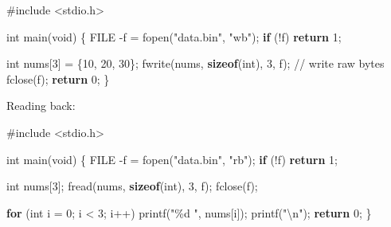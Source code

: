 \documentclass[
  letterpaper,
  DIV=11,
  numbers=noendperiod]{scrreprt}
\newenvironment{Shaded}{\begin{snugshade}}{\end{snugshade}}
\newcommand{\CommentTok}[1]{\textcolor[rgb]{0.37,0.37,0.37}{#1}}
\newcommand{\ControlFlowTok}[1]{\textcolor[rgb]{0.00,0.23,0.31}{\textbf{#1}}}
\newcommand{\DataTypeTok}[1]{\textcolor[rgb]{0.68,0.00,0.00}{#1}}
\newcommand{\DecValTok}[1]{\textcolor[rgb]{0.68,0.00,0.00}{#1}}
\newcommand{\ImportTok}[1]{\textcolor[rgb]{0.00,0.46,0.62}{#1}}
\newcommand{\KeywordTok}[1]{\textcolor[rgb]{0.00,0.23,0.31}{\textbf{#1}}}
\newcommand{\NormalTok}[1]{\textcolor[rgb]{0.00,0.23,0.31}{#1}}
\newcommand{\OperatorTok}[1]{\textcolor[rgb]{0.37,0.37,0.37}{#1}}
\newcommand{\PreprocessorTok}[1]{\textcolor[rgb]{0.68,0.00,0.00}{#1}}
\newcommand{\SpecialCharTok}[1]{\textcolor[rgb]{0.37,0.37,0.37}{#1}}
\newcommand{\StringTok}[1]{\textcolor[rgb]{0.13,0.47,0.30}{#1}}
\begin{document}
\begin{Shaded}
\begin{Highlighting}[]
\PreprocessorTok{\#include }\ImportTok{\textless{}stdio.h\textgreater{}}

\DataTypeTok{int}\NormalTok{ main}\OperatorTok{(}\DataTypeTok{void}\OperatorTok{)} \OperatorTok{\{}
    \DataTypeTok{FILE} \OperatorTok{{-}}\NormalTok{f }\OperatorTok{=}\NormalTok{ fopen}\OperatorTok{(}\StringTok{"data.bin"}\OperatorTok{,} \StringTok{"wb"}\OperatorTok{);}
    \ControlFlowTok{if} \OperatorTok{(!}\NormalTok{f}\OperatorTok{)} \ControlFlowTok{return} \DecValTok{1}\OperatorTok{;}

    \DataTypeTok{int}\NormalTok{ nums}\OperatorTok{[}\DecValTok{3}\OperatorTok{]} \OperatorTok{=} \OperatorTok{\{}\DecValTok{10}\OperatorTok{,} \DecValTok{20}\OperatorTok{,} \DecValTok{30}\OperatorTok{\};}
\NormalTok{    fwrite}\OperatorTok{(}\NormalTok{nums}\OperatorTok{,} \KeywordTok{sizeof}\OperatorTok{(}\DataTypeTok{int}\OperatorTok{),} \DecValTok{3}\OperatorTok{,}\NormalTok{ f}\OperatorTok{);} \CommentTok{// write raw bytes}
\NormalTok{    fclose}\OperatorTok{(}\NormalTok{f}\OperatorTok{);}
    \ControlFlowTok{return} \DecValTok{0}\OperatorTok{;}
\OperatorTok{\}}
\end{Highlighting}
\end{Shaded}

Reading back:

\begin{Shaded}
\begin{Highlighting}[]
\PreprocessorTok{\#include }\ImportTok{\textless{}stdio.h\textgreater{}}

\DataTypeTok{int}\NormalTok{ main}\OperatorTok{(}\DataTypeTok{void}\OperatorTok{)} \OperatorTok{\{}
    \DataTypeTok{FILE} \OperatorTok{{-}}\NormalTok{f }\OperatorTok{=}\NormalTok{ fopen}\OperatorTok{(}\StringTok{"data.bin"}\OperatorTok{,} \StringTok{"rb"}\OperatorTok{);}
    \ControlFlowTok{if} \OperatorTok{(!}\NormalTok{f}\OperatorTok{)} \ControlFlowTok{return} \DecValTok{1}\OperatorTok{;}

    \DataTypeTok{int}\NormalTok{ nums}\OperatorTok{[}\DecValTok{3}\OperatorTok{];}
\NormalTok{    fread}\OperatorTok{(}\NormalTok{nums}\OperatorTok{,} \KeywordTok{sizeof}\OperatorTok{(}\DataTypeTok{int}\OperatorTok{),} \DecValTok{3}\OperatorTok{,}\NormalTok{ f}\OperatorTok{);}
\NormalTok{    fclose}\OperatorTok{(}\NormalTok{f}\OperatorTok{);}

    \ControlFlowTok{for} \OperatorTok{(}\DataTypeTok{int}\NormalTok{ i }\OperatorTok{=} \DecValTok{0}\OperatorTok{;}\NormalTok{ i }\OperatorTok{\textless{}} \DecValTok{3}\OperatorTok{;}\NormalTok{ i}\OperatorTok{++)}\NormalTok{ printf}\OperatorTok{(}\StringTok{"}\SpecialCharTok{\%d}\StringTok{ "}\OperatorTok{,}\NormalTok{ nums}\OperatorTok{[}\NormalTok{i}\OperatorTok{]);}
\NormalTok{    printf}\OperatorTok{(}\StringTok{"}\SpecialCharTok{\textbackslash{}n}\StringTok{"}\OperatorTok{);}
    \ControlFlowTok{return} \DecValTok{0}\OperatorTok{;}
\OperatorTok{\}}
\end{Highlighting}
\end{Shaded}
\end{document}
